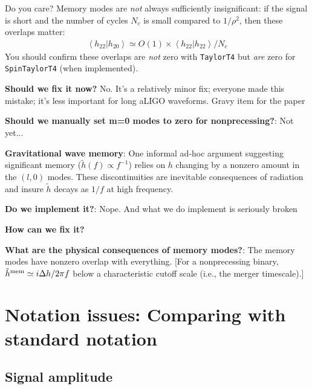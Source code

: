 \documentclass[twocolumn,prd,nofootinbib]{revtex4}
\newcommand\editremark[1]{{\color{red} #1}}
\newcommand\qmstateproduct[2]{\left\langle#1|#2\right\rangle}
\begin{document}
Do you care?  Memory modes are \emph{not} always sufficiently insignificant: if the signal is short and the number of cycles
$N_{c}$ is small compared to $1/\rho^2$, then these overlaps matter:
\begin{eqnarray}
\qmstateproduct{h_{22}}{h_{20}} \simeq O(1) \times \qmstateproduct{h_{22}}{h_{22}}/N_c 
\end{eqnarray}
You should confirm these overlaps are \emph{not} zero with \texttt{TaylorT4} but \emph{are} zero for
\texttt{SpinTaylorT4} (when implemented).

\textbf{Should we fix it now?} No.  It's a relatively minor fix; everyone made this mistake; it's less important for
long aLIGO waveforms. \editremark{Gravy item for the paper}

\textbf{Should we manually set m=0 modes to zero for nonprecessing?}: Not yet...

\begin{shaded}
\noindent \textbf{Gravitational wave memory}: One informal   ad-hoc argument suggesting significant memory ($\tilde{h}(f)\propto f^{-1}$)
  relies on $h$ changing by a nonzero amount in the $(l,0)$ modes.    These discontinuities are inevitable consequences
  of radiation and insure $\tilde{h}$ decays as $1/f$ at high frequency.

\noindent \textbf{Do we implement it?}: Nope.  And what we do implement is seriously broken

\noindent \textbf{How can we fix it?}

\noindent \textbf{What are the physical consequences of memory modes?}: The memory modes have nonzero overlap with
everything. [For a nonprecessing binary, $\tilde{h}^{\rm mem} \simeq i \Delta h/2\pi f$ below a characteristic cutoff
scale (i.e., the merger timescale).]
\end{shaded}
\section{Notation issues: Comparing with standard notation}

\subsection{Signal amplitude}
\end{document}
